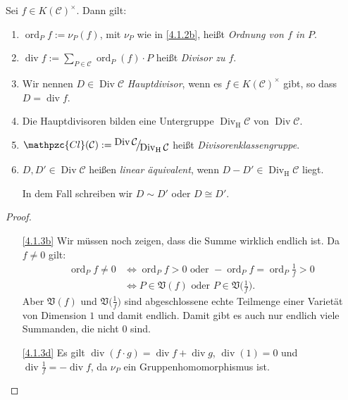 \documentclass[a4paper,12pt]{scrbook}
\theoremstyle{keinenummern} %
\theoremstyle{mitnummern}
\theoremstyle{unserbeweis}
\newtheorem{proof}{Beweis}
\def\CC{\mathcal{C}}
\def\V{\mathfrak{V}}
\newcommand{\Cl}{\mathpzc{Cl}}
\newcommand{\Div}{\operatorname{Div}}
\newcommand{\Divh}{\Div_{\mathrm{H}}}
\renewcommand{\div}{\operatorname{div}}
\newcommand{\ord}{\operatorname{ord}}
\newcommand{\Quotient}[2]{
  \mathchoice
  { %
    \raisebox{0.7ex}{\ensuremath{#1}}
    \ensuremath{\mkern-3mu}\big/\ensuremath{\mkern-3mu}
    \raisebox{-0.6ex}{\ensuremath{#2}}
  }
  { %
    #1/#2
  }
  { %
    #1/#2
  }
  { %
    #1/#2
  }
}
\begin{document}
\begin{db}\label{4.1.3}
Sei $f\in K(\CC)^{\times}$. Dann gilt:
\begin{enumerate}
\item{} $\ord_{P}f:=\nu_{P}(f)$, mit $\nu_{P}$ wie in \cref{4.1.2b}, heißt \emph{Ordnung von $f$ in $P$}.
\item{} $\displaystyle\div f:=\sum_{P\in\CC}\ord_{P}(f)\cdot P$ heißt \emph{Divisor zu $f$}.
\item{} Wir nennen $D\in\Div\CC$ \emph{Hauptdivisor}, wenn es $f\in K(\CC)^{\times}$ gibt, so dass $D=\div f$.
\item{} Die Hauptdivisoren bilden eine Untergruppe $\Divh\CC$ von $\Div\CC$.
\item{} $\displaystyle\Cl(\CC):=\Quotient{\Div\CC}{\Divh\CC}$ heißt \emph{Divisorenklassengruppe}.
\item{} $D,D'\in\Div\CC$ heißen \emph{linear äquivalent}, wenn $D-D'\in\Divh\CC$ liegt.

In dem Fall schreiben wir $D\sim D'$ oder $D\cong D'$.
\end{enumerate}\end{db}

\begin{proof}\begin{enumerate}
\item[\ref{4.1.3b}] Wir müssen noch zeigen, dass die Summe wirklich endlich ist. Da $f\neq 0$ gilt:
\begin{align*}
\ord_{P}f\neq 0&\iff\ord_{P}f>0\text{ oder }-\ord_{P}f=\ord_{P}\tfrac{1}{f}>0\\
&\iff P\in\V(f)\text{ oder }P\in\V\bigl(\tfrac{1}{f}\bigr).
\end{align*}
Aber $\V(f)$ und $\V\bigl(\tfrac{1}{f}\bigr)$ sind abgeschlossene echte Teilmenge einer Varietät von Dimension $1$ und damit endlich. Damit gibt es auch nur endlich viele Summanden, die nicht $0$ sind.
\item[\ref{4.1.3d}] Es gilt $\div(f\cdot g)=\div f + \div g$, $\div(1)=0$ und $\div\frac{1}{f}=-\div f$, da $\nu_{P}$ ein Gruppenhomomorphismus ist.
\end{enumerate}\end{proof}
\end{document}
